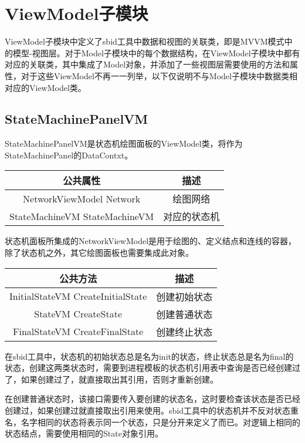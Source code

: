 \chapter{ViewModel子模块}
ViewModel子模块中定义了sbid工具中数据和视图的关联类，即是MVVM模式中的模型-视图层。对于Model子模块中的每个数据结构，在ViewModel子模块中都有对应的关联类，其中集成了Model对象，并添加了一些视图层需要使用的方法和属性，对于这些ViewModel不再一一列举，以下仅说明不与Model子模块中数据类相对应的ViewModel类。

\section{StateMachinePanelVM}
StateMachinePanelVM是状态机绘图面板的ViewModel类，将作为StateMachinePanel的DataContxt。
\par
\begin{table}[h]
	\centering
	\begin{tabular}{|c|c|}
		\hline
		\textbf{公共属性}                 & \textbf{描述} \\ \hline
		NetworkViewModel Network      & 绘图网络        \\ \hline
		StateMachineVM StateMachineVM & 对应的状态机      \\ \hline
	\end{tabular}
\end{table}
\par
状态机面板所集成的NetworkViewModel是用于绘图的、定义结点和连线的容器，除了状态机之外，其它绘图面板也需要集成此对象。
\par
\begin{table}[h]
	\centering
	\begin{tabular}{|c|c|}
		\hline
		\textbf{公共方法}                     & \textbf{描述} \\ \hline
		InitialStateVM CreateInitialState & 创建初始状态      \\ \hline
		StateVM CreateState               & 创建普通状态      \\ \hline
		FinalStateVM CreateFinalState     & 创建终止状态      \\ \hline
	\end{tabular}
\end{table}
\par
在sbid工具中，状态机的初始状态总是名为init的状态，终止状态总是名为final的状态，创建这两类状态时，需要到进程模板的状态机引用表中查询是否已经创建过了，如果创建过了，就直接取出其引用，否则才重新创建。
\par
在创建普通状态时，该接口需要传入要创建的状态名，这时要检查该状态是否已经创建过，如果创建过就直接取出引用来使用。sbid工具中的状态机并不反对状态重名，名字相同的状态将表示同一个状态，只是分开来定义了而已。对逻辑上相同的状态结点，需要使用相同的State对象引用。
